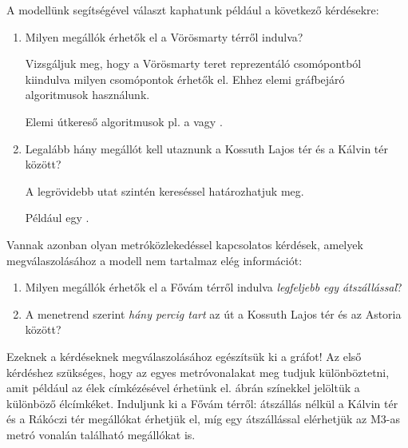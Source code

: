 A modellünk segítségével választ kaphatunk például a következő kérdésekre:

\begin{enumerate}
	\item Milyen megállók érhetők el a Vörösmarty térről indulva?

		Vizsgáljuk meg, hogy a Vörösmarty teret reprezentáló csomópontból kiindulva milyen csomópontok érhetők el. Ehhez elemi gráfbejáró algoritmusok használunk.

		\begin{megjegyzes}
			Elemi útkereső algoritmusok pl. a  vagy .
		\end{megjegyzes}
	\item Legalább hány megállót kell utaznunk a Kossuth Lajos tér és a Kálvin tér között?

		A legrövidebb utat szintén kereséssel határozhatjuk meg.

		\begin{megjegyzes}
			Például egy \fogalomragozva{BFS}{szélességi kereséssel}.
		\end{megjegyzes}

\end{enumerate}

Vannak azonban olyan metróközlekedéssel kapcsolatos kérdések, amelyek megválaszolásához a modell nem tartalmaz elég információt:

\begin{enumerate}
	\item Milyen megállók érhetők el a Fővám térről indulva \emph{legfeljebb egy átszállással}?
	\item A menetrend szerint \emph{hány percig tart} az út a Kossuth Lajos tér és az Astoria között?
\end{enumerate}

Ezeknek a kérdéseknek megválaszolásához egészítsük ki a gráfot! Az első kérdéshez szükséges, hogy az egyes metróvonalakat meg tudjuk különböztetni, amit például az élek címkézésével érhetünk el.  ábrán színekkel jelöltük a különböző élcímkéket. Induljunk ki a Fővám térről: átszállás nélkül a Kálvin tér és a Rákóczi tér megállókat érhetjük el, míg egy átszállással elérhetjük az M3-as metró vonalán található megállókat is.

